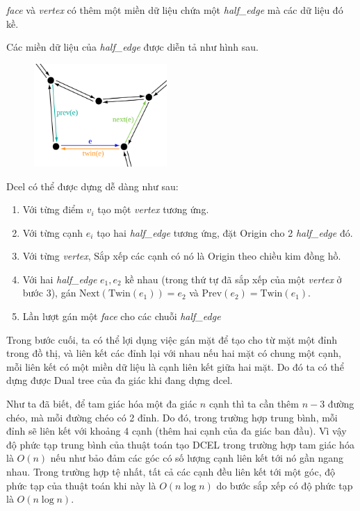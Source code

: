 \textit{face} và \textit{vertex} có thêm một miền dữ liệu chứa một \textit{half\_edge} mà các dữ liệu đó kề.

Các miền dữ liệu của \textit{half\_edge} được diễn tả như hình sau.
\begin{figure}[h]
  \centering
  \includegraphics[width=0.45\textwidth]{Images/Dcel-halfedge-connectivity.svg.png}
\end{figure}

Dcel có thể được dựng dễ dàng như sau\cite{dcel}:
\begin{enumerate}
    \item Với từng điểm $v_i$ tạo một \textit{vertex} tương ứng.
    \item Với từng cạnh $e_i$ tạo hai \textit{half\_edge} tương ứng, đặt Origin cho 2 \textit{half\_edge} đó.
    \item Với từng \textit{vertex}, Sắp xếp các cạnh có nó là Origin theo chiều kim đồng hồ.
    \item Với hai \textit{half\_edge} $e_1, e_2$ kề nhau (trong thứ tự đã sắp xếp của một \textit{vertex} ở bước 3), gán $\text{Next}(\text{Twin}(e_1)) = e_2$ và $\text{Prev}(e_2) = \text{Twin}(e_1)$. 
    \item Lần lượt gán một \textit{face} cho các chuỗi \textit{half\_edge}
\end{enumerate}
Trong bước cuối, ta có thể lợi dụng việc gán mặt để tạo cho từ mặt một đỉnh trong đồ thị, và liên kết các đỉnh lại với nhau nếu hai mặt có chung một cạnh, mỗi liên kết có một miền dữ liệu là cạnh liên kết giữa hai mặt. Do đó ta có thể dựng được Dual tree của đa giác khi đang dựng dcel.

Như ta đã biết, để tam giác hóa một đa giác $n$ cạnh thì ta cần thêm $n-3$ đường chéo, mà mỗi đường chéo có 2 đỉnh. Do đó, trong trường hợp trung bình, mỗi đỉnh sẽ liên kết với khoảng 4 cạnh (thêm hai cạnh của đa giác ban đầu). Vì vậy độ phức tạp trung bình của thuật toán tạo DCEL trong trường hợp tam giác hóa là $O(n)$ nếu như bảo đảm các góc có số lượng cạnh liên kết tới nó gần ngang nhau. Trong trường hợp tệ nhất, tất cả các cạnh đều liên kết tới một góc, độ phức tạp của thuật toán khi này là $O(n\log n)$ do bước sắp xếp có độ phức tạp là $O(n\log n)$.
